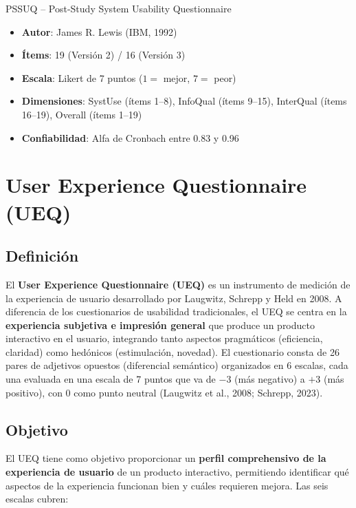 \documentclass[a4paper,12pt]{report}
\begin{document}
\begin{definitionbox}{PSSUQ -- Post-Study System Usability Questionnaire}
\begin{itemize}
    \item \textbf{Autor}: James R. Lewis (IBM, 1992)
    \item \textbf{Ítems}: 19 (Versión 2) / 16 (Versión 3)
    \item \textbf{Escala}: Likert de 7 puntos ($1 =$ mejor, $7 =$ peor)
    \item \textbf{Dimensiones}: SystUse (ítems 1--8), InfoQual (ítems 9--15), InterQual (ítems 16--19), Overall (ítems 1--19)
    \item \textbf{Confiabilidad}: Alfa de Cronbach entre 0.83 y 0.96
\end{itemize}
\end{definitionbox}

\section{User Experience Questionnaire (UEQ)}

\subsection{Definición}

El \textbf{User Experience Questionnaire (UEQ)} es un instrumento de medición de la experiencia de usuario desarrollado por Laugwitz, Schrepp y Held en 2008. A diferencia de los cuestionarios de usabilidad tradicionales, el UEQ se centra en la \textbf{experiencia subjetiva e impresión general} que produce un producto interactivo en el usuario, integrando tanto aspectos pragmáticos (eficiencia, claridad) como hedónicos (estimulación, novedad). El cuestionario consta de 26 pares de adjetivos opuestos (diferencial semántico) organizados en 6 escalas, cada una evaluada en una escala de 7 puntos que va de $-3$ (más negativo) a $+3$ (más positivo), con 0 como punto neutral (Laugwitz et al., 2008; Schrepp, 2023).

\subsection{Objetivo}

El UEQ tiene como objetivo proporcionar un \textbf{perfil comprehensivo de la experiencia de usuario} de un producto interactivo, permitiendo identificar qué aspectos de la experiencia funcionan bien y cuáles requieren mejora. Las seis escalas cubren:
\end{document}
